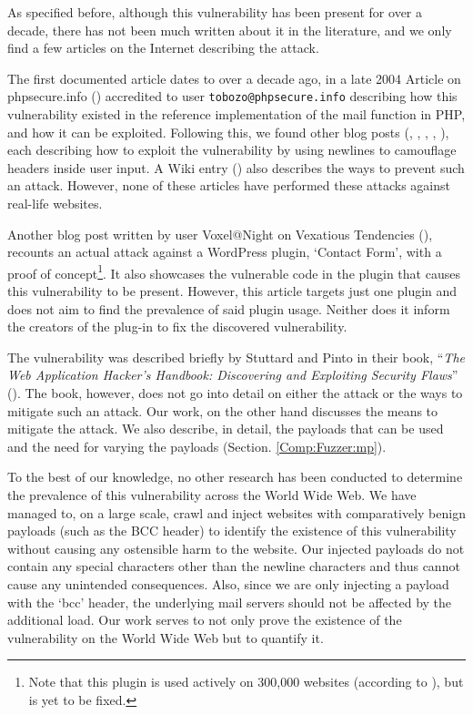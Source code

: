 As specified before, although this vulnerability has been present for over a decade, there has not been much written about it in the literature, and we only find a few articles on the Internet describing the attack.

The first documented article dates to over a decade ago, in a late 2004 Article on phpsecure.info (\cite{Tobozo}) accredited to user \lstinline|tobozo@phpsecure.info| describing how this vulnerability existed in the reference implementation of the mail function in PHP, and how it can be exploited. Following this, we found other blog posts (\cite{Calin}, \cite{DK}, \cite{Injection2}, \cite{Nicol}, \cite{Pope}), each describing how to exploit the vulnerability by using newlines to camouflage headers inside user input. A Wiki entry (\cite{Injection}) also describes the ways to prevent such an attack. However, none of these articles have performed these attacks against real-life websites.

Another blog post written by user Voxel@Night on Vexatious Tendencies (\cite{Tendencies2014}), recounts an actual attack against a WordPress plugin, `Contact Form', with a proof of concept\footnote{Note that this plugin is used actively on 300,000 websites (according to \cite{BestWebSoft2016}), but is yet to be fixed.}. It also showcases the vulnerable code in the plugin that causes this vulnerability to be present. However, this article targets just one plugin and does not aim to find the prevalence of said plugin usage. Neither does it inform the creators of the plug-in to fix the discovered vulnerability.

The vulnerability was described briefly by Stuttard and Pinto in their book, ``\emph{The Web Application Hacker's Handbook: Discovering and Exploiting Security Flaws}'' (\cite{stuttard2011web}). The book, however, does not go into detail on either the attack or the ways to mitigate such an attack. Our work, on the other hand discusses the means to mitigate the attack. We also describe, in detail, the payloads that can be used and the need for varying the payloads (Section. \ref{Comp:Fuzzer:mp}).

To the best of our knowledge, no other research has been conducted to determine the prevalence of this vulnerability across the World Wide Web. We have managed to, on a large scale, crawl and inject websites with comparatively benign payloads (such as the BCC header) to identify the existence of this vulnerability without causing any ostensible harm to the website. Our injected payloads do not contain any special characters other than the newline characters and thus cannot cause any unintended consequences. Also, since we are only injecting a payload with the `bcc' header, the underlying mail servers should not be affected by the additional load. Our work serves to not only prove the existence of the vulnerability on the World Wide Web but to quantify it.

